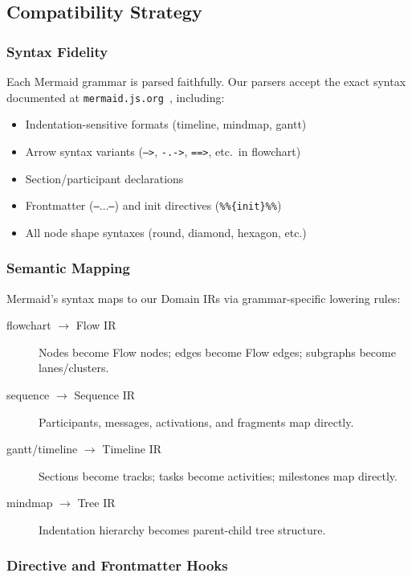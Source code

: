 \subsection{Compatibility Strategy}

\subsubsection{Syntax Fidelity}

Each Mermaid grammar is parsed faithfully. Our parsers accept the exact syntax documented at
\texttt{mermaid.js.org}~\cite{mermaiddocs2024}, including:

\begin{itemize}
  \item Indentation-sensitive formats (timeline, mindmap, gantt)
  \item Arrow syntax variants (\texttt{-->}, \texttt{-.->}, \texttt{==>}, etc.\ in flowchart)
  \item Section/participant declarations
  \item Frontmatter (\texttt{---}$\ldots$\texttt{---}) and init directives (\texttt{\%\%\{init\}\%\%})
  \item All node shape syntaxes (round, diamond, hexagon, etc.)
\end{itemize}

\subsubsection{Semantic Mapping}

Mermaid's syntax maps to our Domain IRs via grammar-specific lowering rules:

\begin{description}
  \item[flowchart $\to$ Flow IR] Nodes become Flow nodes; edges become Flow edges;
        subgraphs become lanes/clusters.
  \item[sequence $\to$ Sequence IR] Participants, messages, activations, and fragments
        map directly.
  \item[gantt/timeline $\to$ Timeline IR] Sections become tracks; tasks become activities;
        milestones map directly.
  \item[mindmap $\to$ Tree IR] Indentation hierarchy becomes parent-child tree structure.
\end{description}

\subsubsection{Directive and Frontmatter Hooks}


